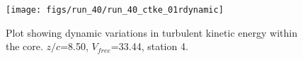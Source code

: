 \begin{figure}[H]
\centering
\texttt{[image: figs/run\_40/run\_40\_ctke\_01rdynamic]}
\caption{Plot showing dynamic variations in turbulent kinetic energy within the core. $z/c$=8.50, $V_{free}$=33.44, station 4.}
\label{fig:run_40_ctke_01rdynamic}
\end{figure}


